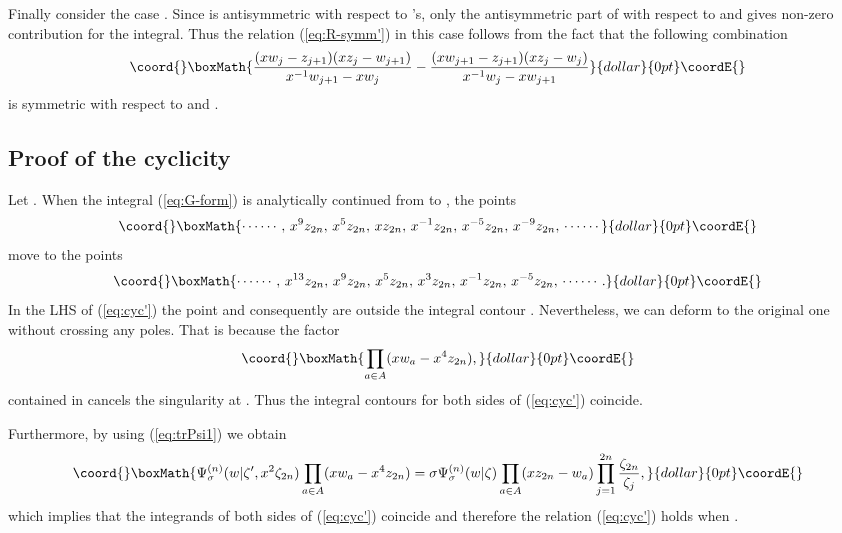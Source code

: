 \documentclass[a4paper,10pt]{article}
\begin{document}
Finally consider the case \coordHE{}. Since 
\coordHE{} is antisymmetric 
with respect to \coordHE{}'s, only the antisymmetric part of 
\coordHE{} with respect to 
\coordHE{} and \coordHE{} gives non-zero contribution for 
the integral. Thus the relation (\ref{eq:R-symm'}) 
in this case follows from the fact that the 
following combination 
$$\coord{}\boxMath{
\frac{(xw_j -z_{j+1})(xz_j -w_{j+1})}
{x^{-1}w_{j+1}-xw_j}-
\frac{(xw_{j+1} -z_{j+1})(xz_j -w_{j})}
{x^{-1}w_{j}-xw_{j+1}}
}{dollar}{0pt}\coordE{}$$
is symmetric with respect to \coordHE{} and \coordHE{}. 

\subsection{Proof of the cyclicity} 

Let \coordHE{}. When the integral (\ref{eq:G-form}) 
is analytically continued from \coordHE{} to 
\coordHE{}, the points 
$$\coord{}\boxMath{
\cdots\cdots, \, x^9 z_{2n}, \, 
x^5 z_{2n}, \, xz_{2n}, \, x^{-1}z_{2n}, 
\, x^{-5}z_{2n}, \, x^{-9}z_{2n}, \, \cdots\cdots
}{dollar}{0pt}\coordE{}$$ 
move to the points 
$$\coord{}\boxMath{
\cdots\cdots, \, x^{13}z_{2n}, \, 
x^9 z_{2n}, \, x^5 z_{2n}, \, x^3 z_{2n}, 
\, x^{-1}z_{2n}, \, x^{-5}z_{2n}, \, \cdots\cdots. 
}{dollar}{0pt}\coordE{}$$ 
In the LHS of (\ref{eq:cyc'}) the point \coordHE{} 
and consequently \coordHE{} are outside the integral 
contour 
\coordHE{}. 
Nevertheless, we can deform \coordHE{} to the original one 
\coordHE{} 
without crossing any poles. That is because 
the factor 
$$\coord{}\boxMath{
\prod_{a\in A} (xw_a -x^4 z_{2n}), 
}{dollar}{0pt}\coordE{}$$
contained in 
\coordHE{} 
cancels the singularity at \coordHE{}. 
Thus the integral contours for both sides of 
(\ref{eq:cyc'}) coincide. 

Furthermore, by using (\ref{eq:trPsi1}) we obtain 
$$\coord{}\boxMath{
\Psi^{(n)}_\sigma (w|\zeta', x^2 \zeta_{2n})
\prod_{a\in A} (xw_a -x^4 z_{2n})=\sigma
\Psi^{(n)}_\sigma (w|\zeta)
\prod_{a\in A} (xz_{2n}-w_a ) 
\prod_{j=1}^{2n} \frac{\zeta_{2n}}{\zeta_j}, 
}{dollar}{0pt}\coordE{}$$
which implies that the integrands of both sides of 
(\ref{eq:cyc'}) coincide and therefore the relation 
(\ref{eq:cyc'}) holds when \coordHE{}. 
\end{document}
